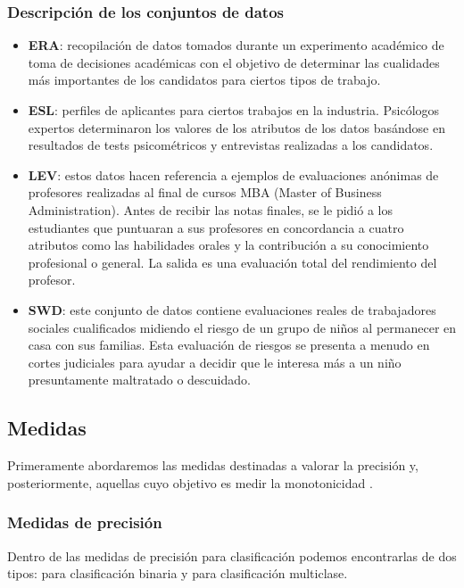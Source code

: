 \subsubsection{Descripción de los conjuntos de datos}

\begin{itemize}
	\item \textbf{ERA}: recopilación de datos tomados durante un experimento académico de toma de decisiones académicas con el objetivo de determinar las cualidades más importantes  de los candidatos para ciertos tipos de trabajo.
	\item \textbf{ESL}: perfiles de aplicantes para ciertos trabajos en la industria. Psicólogos expertos determinaron los valores de los atributos de los datos basándose en resultados de tests psicométricos y entrevistas realizadas a los candidatos.
	\item \textbf{LEV}: estos datos hacen referencia a ejemplos de evaluaciones anónimas de profesores realizadas al final de cursos MBA (Master of Business Administration). Antes de recibir las notas finales, se le pidió a los estudiantes que puntuaran a sus profesores en concordancia a cuatro atributos como las habilidades orales y la contribución a su conocimiento profesional o general. La salida es una evaluación total del rendimiento del profesor.
	\item \textbf{SWD}: este conjunto de datos contiene evaluaciones reales de trabajadores sociales cualificados midiendo el riesgo de un grupo de niños al permanecer en casa con sus familias. Esta evaluación de riesgos se presenta a menudo en cortes judiciales para ayudar a decidir que le interesa más a un niño presuntamente maltratado o descuidado.
\end{itemize}



\subsection{Medidas}

Primeramente abordaremos las medidas destinadas a valorar la precisión y, posteriormente, aquellas cuyo objetivo es medir la monotonicidad \cite{ref15}.

\subsubsection{Medidas de precisión}

Dentro de las medidas de precisión para clasificación podemos encontrarlas de dos tipos: para clasificación binaria y para clasificación multiclase.

